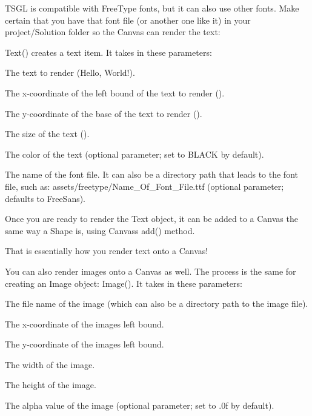 T\+S\+GL is compatible with Free\+Type fonts, but it can also use other fonts. Make certain that you have that font file (or another one like it) in your project/\+Solution folder so the Canvas can render the text\+:


\begin{DoxyCode}{0}
\DoxyCodeLine{\textcolor{preprocessor}{\#include <tsgl.h>}}
\DoxyCodeLine{}
\DoxyCodeLine{\}}
\end{DoxyCode}


{\ttfamily Text()} creates a text item. It takes in these parameters\+:


\begin{DoxyItemize}
\item The text to render ({\ttfamily Hello, World!}).
\item The x-\/coordinate of the left bound of the text to render ({}).
\item The y-\/coordinate of the base of the text to render ({}).
\item The size of the text ({}).
\item The color of the text (optional parameter; set to {\ttfamily B\+L\+A\+CK} by default).
\item The name of the font file. It can also be a directory path that leads to the font file, such as\+: {\ttfamily assets/freetype/\+Name\+\_\+\+Of\+\_\+\+Font\+\_\+\+File.\+ttf} (optional parameter; defaults to Free\+Sans).
\end{DoxyItemize}

Once you are ready to render the Text object, it can be added to a Canvas the same way a Shape is, using Canvas\textquotesingle{}s {\ttfamily add()} method.

That is essentially how you render text onto a Canvas!

You can also render images onto a Canvas as well. The process is the same for creating an Image object\+: {\ttfamily Image()}. It takes in these parameters\+:


\begin{DoxyItemize}
\item The file name of the image (which can also be a directory path to the image file).
\item The x-\/coordinate of the image\textquotesingle{}s left bound.
\item The y-\/coordinate of the image\textquotesingle{}s left bound.
\item The width of the image.
\item The height of the image.
\item The alpha value of the image (optional parameter; set to {.\+0f} by default).
\end{DoxyItemize}

